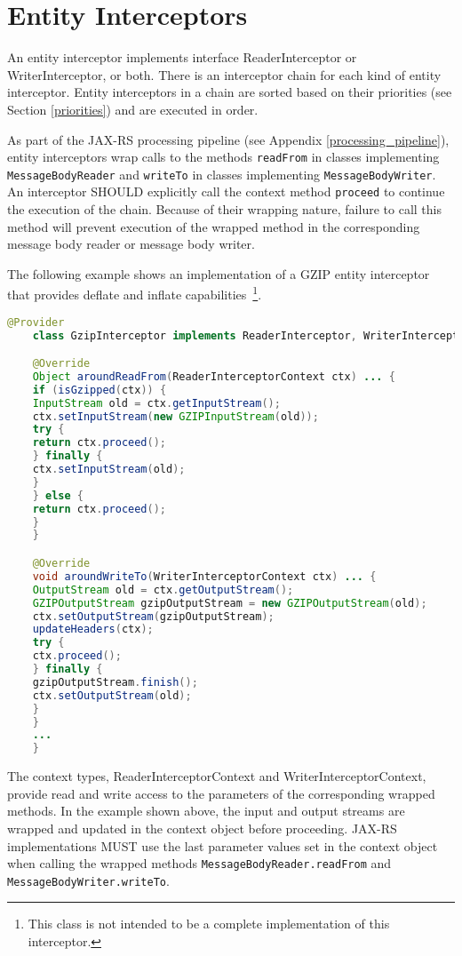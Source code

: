 \section{Entity Interceptors}
\label{entity_interceptors}

An entity interceptor implements interface ReaderInterceptor or WriterInterceptor, or both. There is an interceptor
chain for each kind of entity interceptor. Entity interceptors in a chain are sorted based on their priorities
(see Section \ref{priorities}) and are executed in order.

As part of the JAX-RS processing pipeline (see Appendix \ref{processing_pipeline}), entity interceptors wrap calls to
the methods \lstinline{readFrom} in classes implementing \lstinline{MessageBodyReader} and \lstinline{writeTo} in
classes implementing \lstinline{MessageBodyWriter}. An interceptor SHOULD explicitly call the context method
\lstinline{proceed} to continue the execution of the chain. Because of their wrapping nature, failure to call this
method will prevent execution of the wrapped method in the corresponding message body reader or message body writer.

The following example shows an implementation of a GZIP entity interceptor that provides deflate and inflate
capabilities~\footnote{This class is not intended to be a complete implementation of this interceptor.}.

\begin{lstlisting}[language=Java]
    @Provider
    class GzipInterceptor implements ReaderInterceptor, WriterInterceptor {

    @Override
    Object aroundReadFrom(ReaderInterceptorContext ctx) ... {
    if (isGzipped(ctx)) {
    InputStream old = ctx.getInputStream();
    ctx.setInputStream(new GZIPInputStream(old));
    try {
    return ctx.proceed();
    } finally {
    ctx.setInputStream(old);
    }
    } else {
    return ctx.proceed();
    }
    }

    @Override
    void aroundWriteTo(WriterInterceptorContext ctx) ... {
    OutputStream old = ctx.getOutputStream();
    GZIPOutputStream gzipOutputStream = new GZIPOutputStream(old);
    ctx.setOutputStream(gzipOutputStream);
    updateHeaders(ctx);
    try {
    ctx.proceed();
    } finally {
    gzipOutputStream.finish();
    ctx.setOutputStream(old);
    }
    }
    ...
    }
\end{lstlisting}

The context types, ReaderInterceptorContext and WriterInterceptorContext, provide read and write access to the
parameters of the corresponding wrapped methods. In the example shown above, the input and output streams are wrapped
and updated in the context object before proceeding. JAX-RS implementations MUST use the last parameter values set in
the context object when calling the wrapped methods \lstinline{MessageBodyReader.readFrom} and
\lstinline{MessageBodyWriter.writeTo}.

